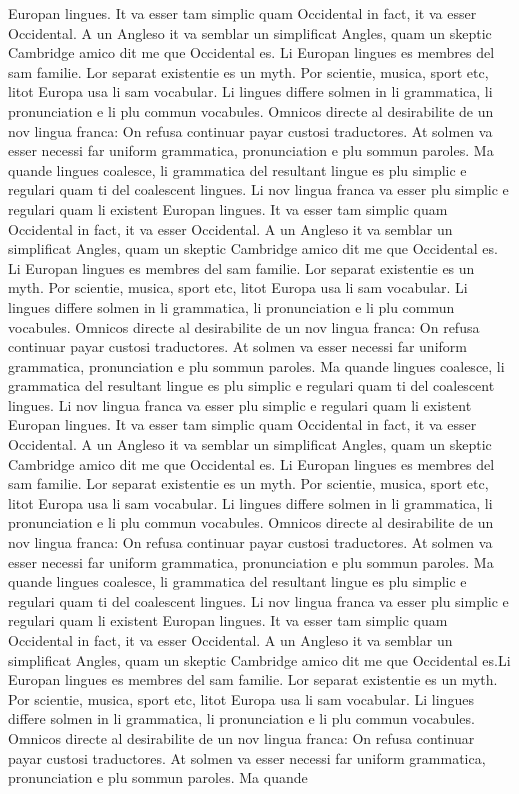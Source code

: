 Europan lingues. It va esser tam simplic quam Occidental in fact, it va esser Occidental. A un Angleso it va semblar un simplificat Angles, quam un skeptic Cambridge amico dit me que Occidental es. Li Europan lingues es membres del sam familie. Lor separat existentie es un myth. Por scientie, musica, sport etc, litot Europa usa li sam vocabular. Li lingues differe solmen in li grammatica, li pronunciation e li plu commun vocabules. Omnicos directe al desirabilite de un nov lingua franca: On refusa continuar payar custosi traductores. At solmen va esser necessi far uniform grammatica, pronunciation e plu sommun paroles. Ma quande lingues coalesce, li grammatica del resultant lingue es plu simplic e regulari quam ti del coalescent lingues. Li nov lingua franca va esser plu simplic e regulari quam li existent Europan lingues. It va esser tam simplic quam Occidental in fact, it va esser Occidental. A un Angleso it va semblar un simplificat Angles, quam un skeptic Cambridge amico dit me que Occidental es. Li Europan lingues es membres del sam familie. Lor separat existentie es un myth. Por scientie, musica, sport etc, litot Europa usa li sam vocabular. Li lingues differe solmen in li grammatica, li pronunciation e li plu commun vocabules. Omnicos directe al desirabilite de un nov lingua franca: On refusa continuar payar custosi traductores. At solmen va esser necessi far uniform grammatica, pronunciation e plu sommun paroles. Ma quande lingues coalesce, li grammatica del resultant lingue es plu simplic e regulari quam ti del coalescent lingues. Li nov lingua franca va esser plu simplic e regulari quam li existent Europan lingues. It va esser tam simplic quam Occidental in fact, it va esser Occidental. A un Angleso it va semblar un simplificat Angles, quam un skeptic Cambridge amico dit me que Occidental es. Li Europan lingues es membres del sam familie. Lor separat existentie es un myth. Por scientie, musica, sport etc, litot Europa usa li sam vocabular. Li lingues differe solmen in li grammatica, li pronunciation e li plu commun vocabules. Omnicos directe al desirabilite de un nov lingua franca: On refusa continuar payar custosi traductores. At solmen va esser necessi far uniform grammatica, pronunciation e plu sommun paroles. Ma quande lingues coalesce, li grammatica del resultant lingue es plu simplic e regulari quam ti del coalescent lingues. Li nov lingua franca va esser plu simplic e regulari quam li existent Europan lingues. It va esser tam simplic quam Occidental in fact, it va esser Occidental. A un Angleso it va semblar un simplificat Angles, quam un skeptic Cambridge amico dit me que Occidental es.Li Europan lingues es membres del sam familie. Lor separat existentie es un myth. Por scientie, musica, sport etc, litot Europa usa li sam vocabular. Li lingues differe solmen in li grammatica, li pronunciation e li plu commun vocabules. Omnicos directe al desirabilite de un nov lingua franca: On refusa continuar payar custosi traductores. At solmen va esser necessi far uniform grammatica, pronunciation e plu sommun paroles. Ma quande 